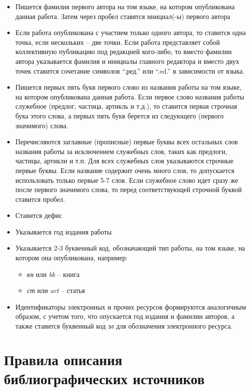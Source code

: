 \begin{itemize}
	\item Пишется фамилия первого автора на том языке, на котором опубликована данная работа. Затем через пробел ставятся инициал(-ы) первого автора
	\item Если работа опубликована с участием только одного автора, то ставится одна точка, если нескольких -- две точки. Если работа представляет собой коллективную публикацию под редакцией кого-либо, то вместо фамилии автора указывается фамилия и инициалы главного редактора и вместо двух точек ставится сочетание символов ``.ред.'' или ``.ed.'' в зависимости от языка.
	\item Пишется первых пять букв первого слово из названия работы на том языке, на котором опубликована данная работа. Если первое слово названия работы служебное (предлог, частица, артикль и т.д.), то ставится первая строчная бука этого слова, а первых пять букв берется из следующего (первого значимого) слова.
	\item Перечисляются заглавные (прописные) первые буквы всех остальных слов названия работы за исключением служебных слов, таких как предлоги, частицы, артикли и т.п. Для всех служебных слов указываются строчные первые буквы. Если название содержит очень много слов, то допускается использовать только первые 5-7 слов. Если служебное слово идет сразу же после первого значимого слова, то перед соответствующей строчной буквой ставится пробел.
	\item Ставится дефис
	\item Указывается год издания работы
	\item Указывается 2-3 буквенный код, обозначающий тип работы, на том языке, на котором она опубликована, например:
	\begin{itemize}
		\item \textit{кн} или \textit{bk} -- книга
		\item \textit{ст} или \textit{art} -- статья
	\end{itemize}
	
	\item Идентификаторы электронных и прочих ресурсов формируются аналогичным образом, с учетом того, что опускается год издания и фамилии авторов, а также ставится буквенный код \textit{эл} для обозначения электронного ресурса.
	
\end{itemize}

\section*{Правила описания библиографических источников}

